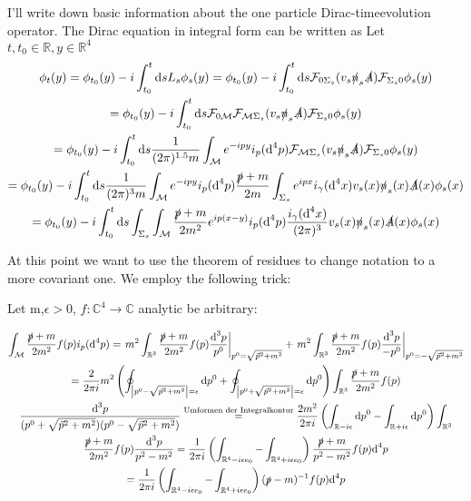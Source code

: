 \documentclass[a4paper,12pt]{article}
\newcommand{\equaltext}[1]{\ensuremath{\stackrel{\text{#1}}{=}}}
\begin{document}
I'll write down basic information about the one particle Dirac-timeevolution operator. The Dirac equation in integral form can be written as 
Let \(t,t_0\in\mathbb{R}, y\in\mathbb{R}^4\)
\begin{multline}\label{dirac_integral}
\phi_t(y)=\phi_{t_0}(y)-i \int_{t_0}^t \text{d}s L_s \phi_s(y)=\phi_{t_0}(y)
-i \int_{t_0}^t \text{d}s\mathcal{F}_{0\Sigma_s}(v_s\slashed{n}_s \slashed{A})\mathcal{F}_{\Sigma_s 0}\phi_s(y)\\
=\phi_{t_0}(y)
-i \int_{t_0}^t \text{d}s\mathcal{F}_{0\mathcal{M}}\mathcal{F}_{\mathcal{M}\Sigma_s}(v_s\slashed{n}_s \slashed{A})\mathcal{F}_{\Sigma_s 0}\phi_s(y)\\
=\phi_{t_0}(y)
-i \int_{t_0}^t \text{d}s \frac{1}{(2\pi)^{1.5}m}\int_{\mathcal{M}}e^{-ipy}i_p(\text{d}^4p) \mathcal{F}_{\mathcal{M}\Sigma_s}(v_s\slashed{n}_s \slashed{A})\mathcal{F}_{\Sigma_s 0}\phi_s(y)\\
=\phi_{t_0}(y)
-i \int_{t_0}^t \text{d}s \frac{1}{(2\pi)^{3}m}\int_{\mathcal{M}}e^{-ipy}i_p(\text{d}^4p) \frac{\slashed{p}+m}{2m}\int_{\Sigma_s}e^{ipx}i_{\gamma}(\text{d}^4x)v_s(x)\slashed{n}_s(x) \slashed{A}(x)\phi_s(x)\\
=\phi_{t_0}(y)
-i \int_{t_0}^t \text{d}s \int_{\Sigma_s}\int_{\mathcal{M}}\frac{\slashed{p}+m}{2m^2}e^{ip(x-y)}i_p(\text{d}^4p) \frac{i_{\gamma}(\text{d}^4x)}{(2\pi)^{3}}v_s(x)\slashed{n}_s(x) \slashed{A}(x)\phi_s(x)\\
\end{multline}

At this point we want to use the theorem of residues to change notation to a more covariant one. We employ the following trick:


Let m,\(\epsilon >0\), \(f:\mathbb{C}^4\rightarrow \mathbb{C}\) analytic be arbitrary:

\begin{multline}
\int_{\mathcal{M}}\frac{\slashed{p}+m}{2 m^2} f(p) i_p(\text{d}^4p)= \left. m^2 \int_{\mathbb{R}^3}\frac{\slashed{p}+m}{2 m^2} f(p) \frac{\text{d}^3p}{p^0}\right|_{p^0=\sqrt{\vec{p}^2+m^2}}+\left. m^2 \int_{\mathbb{R}^3}\frac{\slashed{p}+m}{2 m^2} f(p) \frac{\text{d}^3p}{-p^0}\right|_{p^0=-\sqrt{\vec{p}^2+m^2}}\\
=\frac{2}{2\pi i}  m^2 \left( \oint_{\left|p^0-\sqrt{\vec{p}^2+m^2}\right|=\epsilon}\text{d}p^0+\oint_{\left|p^0+\sqrt{\vec{p}^2+m^2}\right|=\epsilon}\text{d}p^0 \right) \int_{\mathbb{R}^3}\frac{\slashed{p}+m}{2 m^2} f(p) \\ 
\frac{\text{d}^3p}{(p^0+\sqrt{\vec{p}^2+m^2})(p^0-\sqrt{\vec{p}^2+m^2})} 
\equaltext{Umformen der Integralkontur} \frac{2m^2}{2\pi i}   \left( \int_{\mathbb{R}-i \epsilon}\text{d}p^0-\int_{\mathbb{R}+i\epsilon}\text{d}p^0 \right) \int_{\mathbb{R}^3}\\ 
\frac{\slashed{p}+m}{2 m^2} f(p)  \frac{\text{d}^3p}{p^2-m^2}
=\frac{1}{2\pi i}   \left( \int_{\mathbb{R}^4-i \epsilon e_0}-\int_{\mathbb{R}^4+i \epsilon e_0} \right) \frac{\slashed{p}+m}{p^2-m^2} f(p)  \text{d}^4p\\
=\frac{1}{2\pi i}   \left( \int_{\mathbb{R}^4-i \epsilon e_0}-\int_{\mathbb{R}^4+i \epsilon e_0} \right) (\slashed{p}-m)^{-1} f(p)  \text{d}^4p\\
\end{multline}
\end{document}
